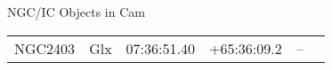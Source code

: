 \begin{block}{NGC/IC Objects in Cam}
  \centering
  \begin{tabularx}{\textwidth}{llrrll} \toprule 
    NGC2403 & Glx & 07:36:51.40 & +65:36:09.2  & -- \\ 
  \end{tabularx}
\end{block}